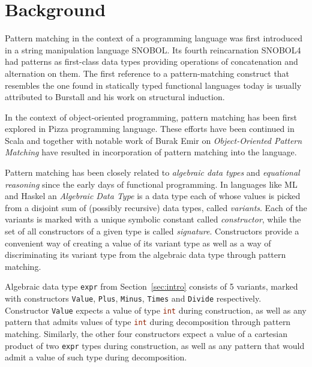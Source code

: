 \documentclass[preprint]{sigplanconf}
\DeclareRobustCommand{\codeocaml}[1]{{\lstinline[breaklines=false,language=Caml]{#1}}}
\begin{document}
\section{Background} %
\label{sec:bg}

Pattern matching in the context of a programming language was first introduced 
in a string manipulation language SNOBOL\cite{SNOBOL64}. Its fourth 
reincarnation SNOBOL4 had patterns as first-class data types providing 
operations of concatenation and alternation on them\cite{SNOBOL71}. The first 
reference to a pattern-matching construct that resembles the one found in 
statically typed functional languages today is usually attributed to Burstall 
and his work on structural induction\cite{Burstall69provingproperties}.

In the context of object-oriented programming, pattern matching has been first 
explored in Pizza programming language\cite{Odersky97pizzainto}. These efforts 
have been continued in Scala\cite{Scala2nd} and together with notable work of 
Burak Emir on \emph{Object-Oriented Pattern Matching}\cite{EmirThesis} have 
resulted in incorporation of pattern matching into the language.



Pattern matching has been closely related to \emph{algebraic data types} and 
\emph{equational reasoning} since the early days of functional programming.
In languages like ML and Haskel an \emph{Algebraic Data Type} is a data type 
each of whose values is picked from a disjoint sum of (possibly recursive) data 
types, called \emph{variants}. Each of the variants is marked with a unique 
symbolic constant called \emph{constructor}, while the set of all constructors 
of a given type is called \emph{signature}. Constructors provide a convenient 
way of creating a value of its variant type as well as a way of discriminating 
its variant type from the algebraic data type through pattern matching.

Algebraic data type \codeocaml{expr} from Section~\ref{sec:intro} consists of 5 
variants, marked with constructors \codeocaml{Value}, \codeocaml{Plus}, 
\codeocaml{Minus}, \codeocaml{Times} and \codeocaml{Divide} respectively. 
Constructor \codeocaml{Value} expects a value of type \codeocaml{int} during 
construction, as well as any pattern that admits values of type \codeocaml{int} 
during decomposition through pattern matching. Similarly, the other four 
constructors expect a value of a cartesian product of two \codeocaml{expr} 
types during construction, as well as any pattern that would admit a value of 
such type during decomposition.
\end{document}
